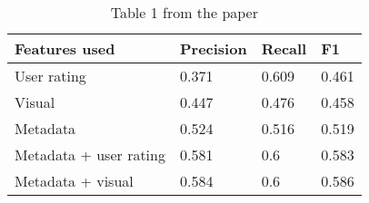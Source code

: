 \documentclass[sigconf]{acmart}
\begin{document}
\begin{table}[hbt!]
  \caption*{Table 1 from the paper}
\begin{tabular}{llll}
\hline
Features used          & Precision & Recall & F1    \\ \hline
User rating            & 0.371     & 0.609  & 0.461 \\
Visual                 & 0.447     & 0.476  & 0.458 \\
Metadata               & 0.524     & 0.516  & 0.519 \\
Metadata + user rating & 0.581     & 0.6    & 0.583 \\
Metadata + visual      & 0.584     & 0.6    & 0.586 \\ \hline
\end{tabular}
\end{table}
\end{document}
